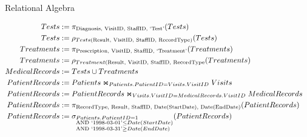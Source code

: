 \documentclass[11pt, letterpaper]{article}
\begin{document}
    Relational Algebra

    \begin{align*}
        Tests           & := \pi_{\text{Diagnosis, VisitID, StaffID, `Test'}}(Tests) \\
        Tests           & := \rho_{Tests(\text{Result, VisitID, StaffID, RecordType})}(Tests) \\
        Treatments      & := \pi_{\text{Prescription, VisitID, StaffID, `Treatment'}}(Treatments) \\
        Treatments      & := \rho_{Treatment(\text{Result, VisitID, StaffID, RecordType}}(Treatments) \\
        MedicalRecords  & := Tests \cup Treatments & \\
        PatientRecords  & := Patients \Join_{Patients.PatientID = Visits.VisitID} Visits \\
        PatientRecords  & := PatientRecords \Join_{Visits.VisitID = MedicalRecords.VisitID} MedicalRecords \\
        PatientRecords  & := \pi_{\text{RecordType, Result, StaffID, Date(StartDate), Date(EndDate)}}(PatientRecords) \\
        PatientRecords  & := \sigma_{\begin{subarray}{l}Patients.PatientID = 1 \\ \text{AND `1998-03-01'} \leq Date(StartDate) \\ \text{AND `1998-03-31'} \geq Date(EndDate)\end{subarray}}(PatientRecords) \\
    \end{align*}
\end{document}
